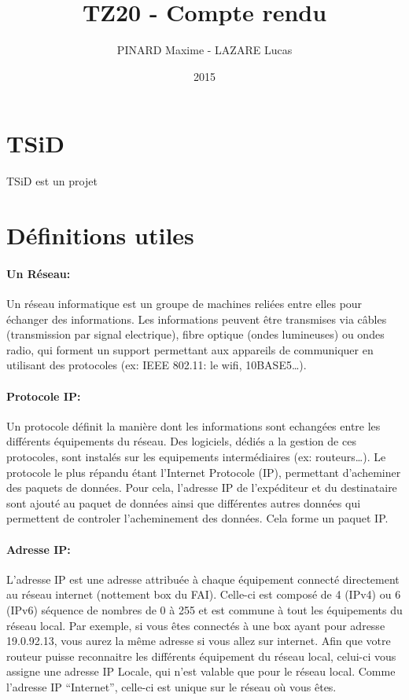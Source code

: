 \documentclass[12pt,a4paper,twoside]{article}
\title{TZ20 - Compte rendu}
\author{PINARD Maxime - LAZARE Lucas}
\date{2015}
\begin{document}
    \maketitle{}
    \newpage{}

    \section{TSiD}
    TSiD est un projet

    \section{Définitions utiles}

    \paragraph*{Un Réseau:\\}
    Un réseau informatique est un groupe de machines reliées entre elles pour échanger des informations. Les informations peuvent être transmises via câbles (transmission par signal electrique), fibre optique (ondes lumineuses) ou ondes radio, qui forment un support permettant aux appareils de communiquer en utilisant des protocoles (ex: IEEE 802.11: le wifi, 10BASE5\ldots).

    \paragraph*{Protocole IP:\\}
    Un protocole définit la manière dont les informations sont echangées entre les différents équipements du réseau. Des logiciels, dédiés a la gestion de ces protocoles, sont instalés sur les equipements intermédiaires (ex: routeurs\ldots{}). Le protocole le plus répandu étant l'Internet Protocole (IP), permettant d'acheminer des paquets de données. Pour cela, l'adresse IP de l'expéditeur et du destinataire sont ajouté au paquet de données ainsi que différentes autres données qui permettent de controler l'acheminement des données. Cela forme un paquet IP.

    \paragraph*{Adresse IP:\\}
    L'adresse IP est une adresse attribuée à chaque équipement connecté directement au réseau internet (nottement box du FAI). Celle-ci est composé de 4 (IPv4) ou 6 (IPv6) séquence de nombres de 0 à 255 et est commune à tout les équipements du réseau local.
    Par exemple, si vous êtes connectés à une box ayant pour adresse 19.0.92.13, vous aurez la même adresse si vous allez sur internet. Afin que votre routeur puisse reconnaitre les différents équipement du réseau local, celui-ci vous assigne une adresse IP Locale, qui n'est valable que pour le réseau local. Comme l'adresse IP ``Internet'', celle-ci est unique sur le réseau où vous êtes.
\end{document}

